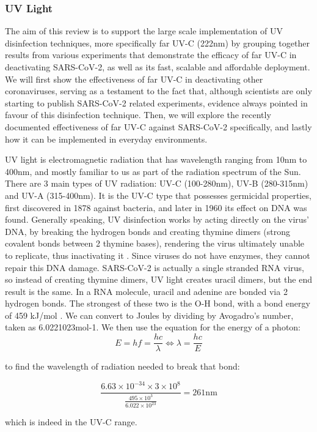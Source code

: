 \documentclass[11pt]{report}
\begin{document}
\subsubsection{UV Light}

The aim of this review is to support the large scale implementation of UV disinfection techniques, more specifically far UV-C (222nm) by grouping together results from various experiments that demonstrate the efficacy of far UV-C in deactivating SARS-CoV-2, as well as its fast, scalable and affordable deployment. We will first show the effectiveness of far UV-C in deactivating other coronaviruses, serving as a testament to the fact that, although scientists are only starting to publish SARS-CoV-2 related experiments, evidence always pointed in favour of this disinfection technique. Then, we will explore the recently documented effectiveness of far UV-C against SARS-CoV-2 specifically, and lastly how it can be implemented in everyday environments. 

UV light is electromagnetic radiation that has wavelength ranging from 10nm to 400nm, and mostly familiar to us as part of the radiation spectrum of the Sun. There are 3 main types of UV radiation: UV-C (100-280nm), UV-B (280-315nm) and UV-A (315-400nm). It is the UV-C type that possesses germicidal properties, first discovered in 1878 against bacteria, and later in 1960 its effect on DNA was found.
Generally speaking, UV disinfection works by acting directly on the virus’ DNA, by breaking the hydrogen bonds and creating thymine dimers (strong covalent bonds between 2 thymine bases), rendering the virus ultimately unable to replicate, thus inactivating it \cite{critical}. Since viruses do not have enzymes, they cannot repair this DNA damage. SARS-CoV-2 is actually a single stranded RNA virus, so instead of creating thymine dimers, UV light creates uracil dimers, but the end result is the same. 
In a RNA molecule, uracil and adenine are bonded via 2 hydrogen bonds. The strongest of these two is the O-H bond, with a bond energy of 459 kJ/mol \cite{chem}. We can convert to Joules by dividing by Avogadro’s number, taken as 6.0221023mol-1. We then use the equation for the energy of a photon: 
$$E=hf=\frac{hc}{\lambda} \iff \lambda =  \frac{hc}{E}$$

to find the wavelength of radiation needed to break that bond:

$$\frac{6.63 \times 10^{-34} \times 3 \times 10^{8}}{\frac{495 \times 10^{3}}{6.022 \times 10^{23}}} = 261 \textrm{nm}$$

which is indeed in the UV-C range.
\end{document}
